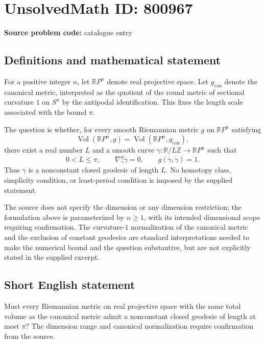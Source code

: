 \documentclass[11pt]{article}
\newcommand{\Z}{\mathbb{Z}}
\newcommand{\R}{\mathbb{R}}
\begin{document}
\section*{UnsolvedMath ID: 800967}
\textbf{Source problem code:} catalogue entry
\subsection{Definitions and mathematical statement}
For a positive integer \(n\), let \(\R P^n\) denote real projective space. Let \(g_{\mathrm{can}}\) denote the canonical metric, interpreted as the quotient of the round metric of sectional curvature \(1\) on \(S^n\) by the antipodal identification. This fixes the length scale associated with the bound \(\pi\).

The question is whether, for every smooth Riemannian metric \(g\) on \(\R P^n\) satisfying
\[
\operatorname{Vol}(\R P^n,g)=\operatorname{Vol}(\R P^n,g_{\mathrm{can}}),
\]
there exist a real number \(L\) and a smooth curve \(\gamma:\R/L\Z\to\R P^n\) such that
\[
0<L\leq\pi,\qquad
\nabla^g_{\dot\gamma}\dot\gamma=0,\qquad
 g(\dot\gamma,\dot\gamma)=1.
\]
Thus \(\gamma\) is a nonconstant closed geodesic of length \(L\). No homotopy class, simplicity condition, or least-period condition is imposed by the supplied statement.

The source does not specify the dimension or any dimension restriction; the formulation above is parameterized by \(n\geq1\), with its intended dimensional scope requiring confirmation. The curvature-\(1\) normalization of the canonical metric and the exclusion of constant geodesics are standard interpretations needed to make the numerical bound and the question substantive, but are not explicitly stated in the supplied excerpt.
\subsection{Short English statement}
Must every Riemannian metric on real projective space with the same total volume as the canonical metric admit a nonconstant closed geodesic of length at most \(\pi\)? The dimension range and canonical normalization require confirmation from the source.
\end{document}
